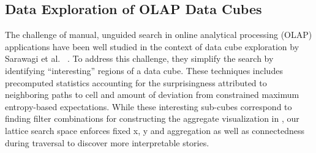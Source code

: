 \subsection{Data Exploration of OLAP Data Cubes} %
The challenge of manual, unguided search in online analytical processing (OLAP) applications have been well studied in the context of data cube exploration by Sarawagi et al. ~\cite{Sarawagi1999,Sarawagi2000,Sarawagi1998}. To address this challenge, they simplify the search by identifying ``interesting'' regions of a data cube. These techniques includes precomputed statistics accounting for the surprisingness attributed to neighboring paths to cell and amount of deviation from constrained maximum entropy-based expectations. While these interesting sub-cubes correspond to finding filter combinations for constructing the aggregate visualization in \system, our lattice search space enforces fixed x, y and aggregation as well as connectedness during traversal to discover more interpretable stories.

\fi
